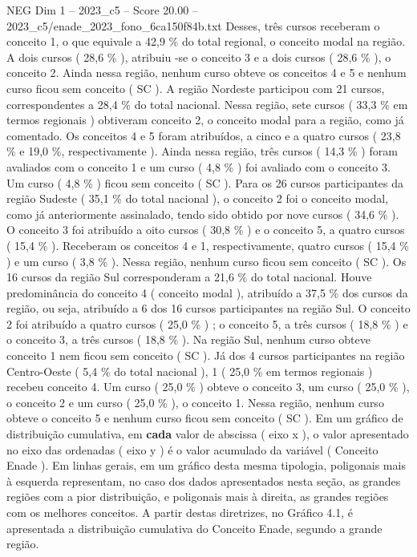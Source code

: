 \begin{textsample}{NEG Dim 1 – 2023\_c5 – Score 20.00 – 2023\_c5/enade\_2023\_fono\_6ca150f84b.txt}
Desses, três cursos receberam o conceito 1, o que equivale a 42,9 \% do total regional, o conceito modal na região.
A dois cursos ( 28,6 \% ), atribuiu -se o conceito 3 e a dois cursos ( 28,6 \% ), o conceito 2.
Ainda nessa região, nenhum curso obteve os conceitos 4 e 5 e nenhum curso ficou sem conceito ( SC ).
A região Nordeste participou com 21 cursos, correspondentes a 28,4 \% do total nacional.
Nessa região, sete cursos ( 33,3 \% em termos regionais ) obtiveram conceito 2, o conceito modal para a região, como já comentado.
Os conceitos 4 e 5 foram atribuídos, a cinco e a quatro cursos ( 23,8 \% e 19,0 \%, respectivamente ).
Ainda nessa região, três cursos ( 14,3 \% ) foram avaliados com o conceito 1 e um curso ( 4,8 \% ) foi avaliado com o conceito 3.
Um curso ( 4,8 \% ) ficou sem conceito ( SC ).
Para os 26 cursos participantes da região Sudeste ( 35,1 \% do total nacional ), o conceito 2 foi o conceito modal, como já anteriormente assinalado, tendo sido obtido por nove cursos ( 34,6 \% ).
O conceito 3 foi atribuído a oito cursos ( 30,8 \% ) e o conceito 5, a quatro cursos ( 15,4 \% ).
Receberam os conceitos 4 e 1, respectivamente, quatro cursos ( 15,4 \% ) e um curso ( 3,8 \% ).
Nessa região, nenhum curso ficou sem conceito ( SC ).
Os 16 cursos da região Sul corresponderam a 21,6 \% do total nacional.
Houve predominância do conceito 4 ( conceito modal ), atribuído a 37,5 \% dos cursos da região, ou seja, atribuído a 6 dos 16 cursos participantes na região Sul.
O conceito 2 foi atribuído a quatro cursos ( 25,0 \% ) ; o conceito 5, a três cursos ( 18,8 \% ) e o conceito 3, a três cursos ( 18,8 \% ).
Na região Sul, nenhum curso obteve conceito 1 nem ficou sem conceito ( SC ).
Já dos 4 cursos participantes na região Centro-Oeste ( 5,4 \% do total nacional ), 1 ( 25,0 \% em termos regionais ) recebeu conceito 4.
Um curso ( 25,0 \% ) obteve o conceito 3, um curso ( 25,0 \% ), o conceito 2 e um curso ( 25,0 \% ), o conceito 1.
Nessa região, nenhum curso obteve o conceito 5 e nenhum curso ficou sem conceito ( SC ).
Em um gráfico de distribuição cumulativa, em \textbf{cada} valor de abscissa ( eixo x ), o valor apresentado no eixo das ordenadas ( eixo y ) é o valor acumulado da variável ( Conceito Enade ).
Em linhas gerais, em um gráfico desta mesma tipologia, poligonais mais à esquerda representam, no caso dos dados apresentados nesta seção, as grandes regiões com a pior distribuição, e poligonais mais à direita, as grandes regiões com os melhores conceitos.
A partir destas diretrizes, no Gráfico 4.1, é apresentada a distribuição cumulativa do Conceito Enade, segundo a grande região.

\end{textsample}
